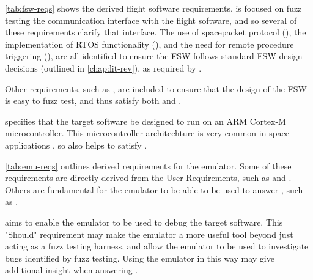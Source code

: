 \documentclass[../report.tex]{subfiles}
\begin{document}
\autoref{tab:fsw-reqs} shows the derived flight software requirements.
 is focused on fuzz testing the communication interface with the
flight software, and so several of these requirements clarify that interface.
The use of spacepacket protocol (), the implementation of RTOS
functionality (), and the need for remote procedure triggering
(), are all identified to ensure the FSW follows standard FSW
design decisions (outlined in \autoref{chap:lit-rev}), as required by
.

Other requirements, such as , are included to ensure that the
design of the FSW is easy to fuzz test, and thus satisfy both  and
.

 specifies that the target software be designed to run on an ARM
Cortex-M microcontroller. This microcontroller architechture is very common in
space applications \citep{Cratere_2024}, so also helps to satisfy .

\autoref{tab:emu-reqs} outlines derived requirements for the emulator. Some of
these requirements are directly derived from the User Requirements, such as
 and . Others are fundamental for the emulator to
be able to be used to answer , such as .

 aims to enable the emulator to be used to debug the target
software. This "Should" requirement may make the emulator a more useful tool
beyond just acting as a fuzz testing harness, and allow the emulator to be used
to investigate bugs identified by fuzz testing. Using the emulator in this way
may give additional insight when answering .
\end{document}
